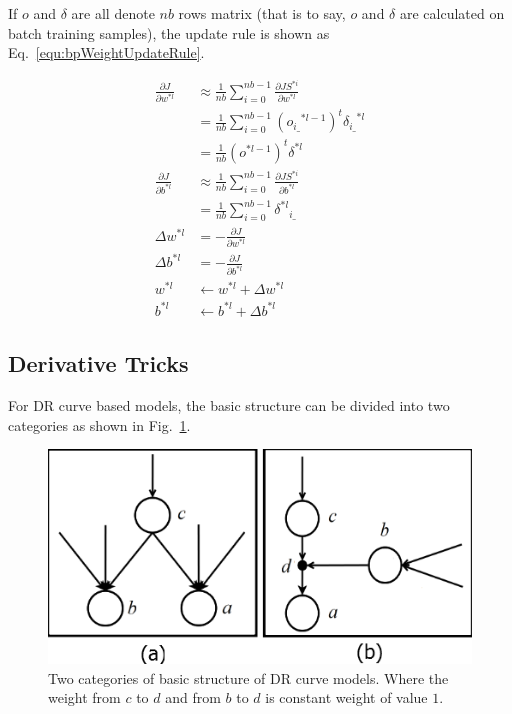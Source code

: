 \documentclass[runningheads,openany]{xhlPaper}
\begin{document}
If $o$ and $\delta$ are all denote $nb$ rows matrix (that is to say, $o$ and $\delta$ are calculated on batch training samples), the update rule is shown as Eq.~\ref{equ:bpWeightUpdateRule}.

\begin{equation}
\label{equ:bpWeightUpdateRule}
\begin{aligned}
\frac{{\partial J}}{{\partial {w^{*l}}}} &\approx \frac{1}{{nb}}\sum\limits_{i = 0}^{nb - 1} {\frac{{\partial J{S^{*i}}}}{{\partial {w^{*l}}}}} \\
 &= \frac{1}{{nb}}\sum\limits_{i = 0}^{nb - 1} {{{\left( {{o_{i\_}}^{*l - 1}} \right)}^t}{\delta _{i\_}}^{*l}} \\
 &= \frac{1}{{nb}}{\left( {{o^{*l - 1}}} \right)^t}{\delta ^{*l}}\\
\frac{{\partial J}}{{\partial {b^{*l}}}} &\approx \frac{1}{{nb}}\sum\limits_{i = 0}^{nb - 1} {\frac{{\partial J{S^{*i}}}}{{\partial {b^{*l}}}}} \\
&= \frac{1}{{nb}}\sum\limits_{i = 0}^{nb - 1} {{\delta ^{*l}}_{i\_}}\\
\Delta w^{*l} &=  - \frac{{\partial J}}{{\partial {w^{*l}}}}\\
\Delta {b^{*l}} &=  - \frac{{\partial J}}{{\partial {b^{*l}}}}\\
w^{*l} &\leftarrow w^{*l} + \Delta w^{*l}\\
b^{*l} &\leftarrow b^{*l} + \Delta b^{*l}
\end{aligned}
\end{equation}

\subsection{Derivative Tricks}
For DR curve based models, the basic structure can be divided into two categories as shown in Fig.~\ref{fig:dr_model_structure_type}.

\begin{figure}
\centering
\includegraphics[width=0.7\linewidth]{dr_model_structure_type}
\caption{Two categories of basic structure of DR curve models. Where the weight from $c$ to $d$ and from $b$ to $d$ is constant weight of value $1$.}
\label{fig:dr_model_structure_type}
\end{figure}
\end{document}
